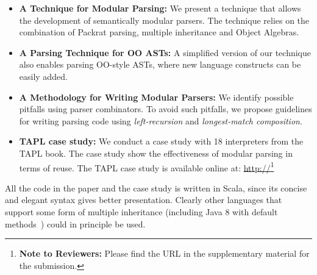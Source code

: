 \begin{itemize}[leftmargin=*]

\item \textbf{A Technique for Modular Parsing:}
  We present a technique that allows the development of semantically modular parsers.
  The technique relies on the combination of Packrat parsing, multiple inheritance
  and Object Algebras.

\item \textbf{A Parsing Technique for OO ASTs:} A simplified version of
  our technique also enables parsing OO-style ASTs, where new language
  constructs can be easily added.

\item \textbf{A Methodology for Writing Modular Parsers:} We
  identify possible pitfalls using parser combinators. To avoid such
  pitfalls, we propose guidelines for writing parsing code using
  \emph{left-recursion} and \emph{longest-match composition}.

\item \textbf{TAPL case study:} We conduct a case study with 18 interpreters
  from the TAPL book. The case study show the effectiveness of modular
  parsing in terms of reuse. The TAPL case study is available online
  at:
  \url{http://}\footnote{\textbf{Note to Reviewers:} Please find the URL in the
    supplementary material for the submission.}

\end{itemize}

All the code in the paper and the case study is written in Scala, since its concise and elegant
syntax gives better presentation. Clearly
other languages that support some form of multiple inheritance
(including Java 8 with default methods~\cite{Goetz2012}) could in principle be
used.
